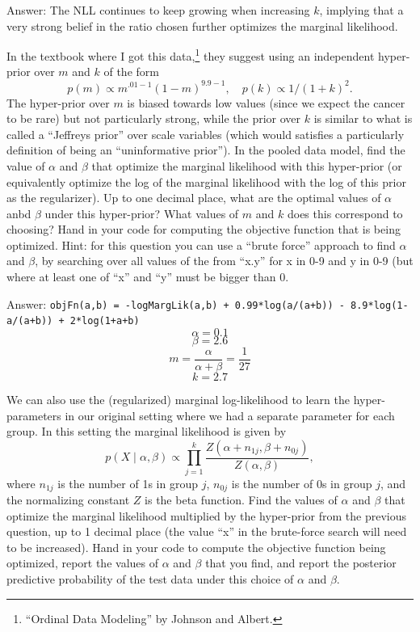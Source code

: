 \documentclass{article}
\def\ans#1{\par\gre{Answer: #1}}
\def\blu#1{{\color{blu}#1}}
\def\gre#1{{\color{gre}#1}}
\def\cond{\; | \;}
\begin{document}
{\ans{
The NLL continues to keep growing when increasing $k$, implying that a very strong belief in the ratio chosen further optimizes the marginal likelihood.
}
\item In the textbook where I got this data,\footnote{``Ordinal Data Modeling'' by Johnson and Albert.} they suggest using an independent hyper-prior over $m$ and $k$ of the form
\[
p(m) \propto m^{.01-1}(1-m)^{9.9-1}, \quad p(k) \propto 1/(1+k)^2.
\]
The hyper-prior over $m$ is biased towards low values (since we expect the cancer to be rare) but not particularly strong, while the prior over $k$ is similar to what is called a ``Jeffreys prior'' over scale variables (which would satisfies a particularly definition of being an ``uninformative prior''). In the pooled data model, find the value of $\alpha$ and $\beta$ that optimize the marginal likelihood with this hyper-prior (or equivalently optimize the log of the marginal likelihood with the log of this prior as the regularizer). \blu{Up to one decimal place, what are the optimal values of $\alpha$ anbd $\beta$ under this hyper-prior? What values of $m$ and $k$ does this correspond to choosing? Hand in your code for computing the objective function that is being optimized.}
Hint: for this question you can use a ``brute force'' approach to find $\alpha$ and $\beta$, by searching over all values of the from ``x.y'' for x in 0-9 and y in 0-9 (but where at least one of ``x'' and ``y'' must be bigger than 0.
\ans{
\texttt{objFn(a,b) = -logMargLik(a,b) + 0.99*log(a/(a+b)) - 8.9*log(1-a/(a+b)) + 2*log(1+a+b)}
\[\alpha=0.1\]
\[\beta=2.6\]
\[m=\frac{\alpha}{\alpha+\beta}=\frac{1}{27}\]
\[k=2.7\]
}
\pagebreak
\item We can also use the (regularized) marginal log-likelihood to learn the hyper-parameters in our original setting where we had a separate parameter for each group. In this setting the marginal likelihood is given by
\[
p(X \cond \alpha, \beta) \propto \prod_{j=1}^k \frac{Z(\alpha+n_{1j},\beta + n_{0j})}{Z(\alpha,\beta)},
\]
where $n_{1j}$ is the number of 1s in group $j$, $n_{0j}$ is the number of 0s in group $j$, and the normalizing constant $Z$ is the beta function. Find the values of $\alpha$ and $\beta$ that optimize the marginal likelihood multiplied by the hyper-prior from the previous question, up to 1 decimal place (the value ``x'' in the brute-force search will need to be increased). \blu{Hand in your code to compute the objective function being optimized, report the values of $\alpha$ and $\beta$ that you find, and report the posterior predictive probability of the test data under this choice of $\alpha$ and $\beta$.}
}
\end{document}
